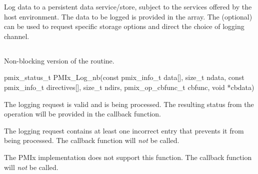 \descr

Log data to a persistent data service/store, subject to the services offered by the host environment. The data to be logged is provided in the  array. The (optional)  can be used to request specific storage options and direct the choice of logging channel.

\subsection{}

\summary

Non-blocking version of the  routine.

\format

\cspecificstart
\begin{codepar}
pmix_status_t
PMIx_Log_nb(const pmix_info_t data[], size_t ndata,
            const pmix_info_t directives[], size_t ndirs,
            pmix_op_cbfunc_t cbfunc, void *cbdata)
\end{codepar}
\cspecificend

\begin{arglist}
\end{arglist}

\begin{constantdesc}
\item {} The logging request is valid and is being processed. The resulting status from the operation will be provided in the callback function.
\item {} The logging request contains at least one incorrect entry that prevents it from being processed. The callback function will \emph{not} be called.
\item {} The \ac{PMIx} implementation does not support this function. The callback function will \emph{not} be called.
\end{constantdesc}

\descr

